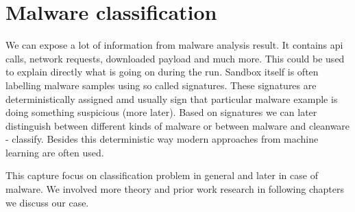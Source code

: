 \chapter{Malware classification}
We can expose a lot of information from malware analysis result. It contains api calls, network requests, downloaded payload and much more. This could be used to explain directly what is going on during the run. Sandbox itself is often labelling malware samples using so called signatures. These signatures are deterministically assigned amd usually sign that particular malware example is doing something suspicious (more later). Based on signatures we can later distinguish between different kinds of malware or between malware and cleanware - classify. Besides this deterministic way modern approaches from machine learning are often used.

This capture focus on classification problem in general and later in case of malware. We involved more theory and prior work research in following chapters we discuss our case.

